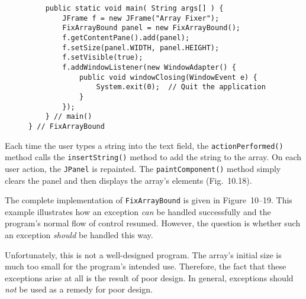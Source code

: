 \begin{figure}[tb]
\addtocounter{figure}{-1}
\jjjprogstart
\begin{jjjlisting}
\begin{lstlisting}
    public static void main( String args[] ) {
        JFrame f = new JFrame("Array Fixer");
        FixArrayBound panel = new FixArrayBound();
        f.getContentPane().add(panel);
        f.setSize(panel.WIDTH, panel.HEIGHT);
        f.setVisible(true);
        f.addWindowListener(new WindowAdapter() { 
            public void windowClosing(WindowEvent e) {
                System.exit(0);  // Quit the application
            }
        });
    } // main()
} // FixArrayBound
\end{lstlisting}
\end{jjjlisting}
\end{figure}



Each time the user types a string into the text field, the
{\tt action\-Performed()} method calls the {\tt insertString()} method to add
the string to the array.  On each user action, the {\tt JPanel} is
repainted.  The {\tt paintComponent()} method simply clears the panel
and then displays the array's elements
(Fig.~10.18).


The complete implementation of {\tt FixArrayBound} is given in Figure~10\mbox{--}19.
This example illustrates how an exception {\it can} be handled
successfully and the program's normal flow of control
resumed.  However, the question is whether such an exception {\it
should} be handled this way.

Unfortunately, this is not a well-designed program.  The array's
initial size is much too small for the program's intended
use.  Therefore, the fact that these exceptions arise at all is the
result of poor design.  In general, exceptions should {\it not} be used
as a remedy for poor design.


